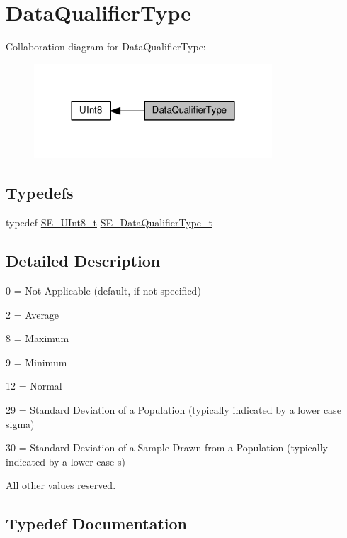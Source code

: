 \hypertarget{group__DataQualifierType}{}\section{Data\+Qualifier\+Type}
\label{group__DataQualifierType}
Collaboration diagram for Data\+Qualifier\+Type\+:\nopagebreak
\begin{figure}[H]
\begin{center}
\leavevmode
\includegraphics[width=252pt]{group__DataQualifierType}
\end{center}
\end{figure}
\subsection*{Typedefs}
\begin{DoxyCompactItemize}
\item 
typedef \hyperlink{group__UInt8_gaf7c365a1acfe204e3a67c16ed44572f5}{S\+E\+\_\+\+U\+Int8\+\_\+t} \hyperlink{group__DataQualifierType_gad1c718c173804210c9562a1ef63a9bf6}{S\+E\+\_\+\+Data\+Qualifier\+Type\+\_\+t}
\end{DoxyCompactItemize}


\subsection{Detailed Description}
0 = Not Applicable (default, if not specified)

2 = Average

8 = Maximum

9 = Minimum

12 = Normal

29 = Standard Deviation of a Population (typically indicated by a lower case sigma)

30 = Standard Deviation of a Sample Drawn from a Population (typically indicated by a lower case \textquotesingle{}s\textquotesingle{})

All other values reserved. 

\subsection{Typedef Documentation}
\mbox{\label{group__DataQualifierType_gad1c718c173804210c9562a1ef63a9bf6}} 
